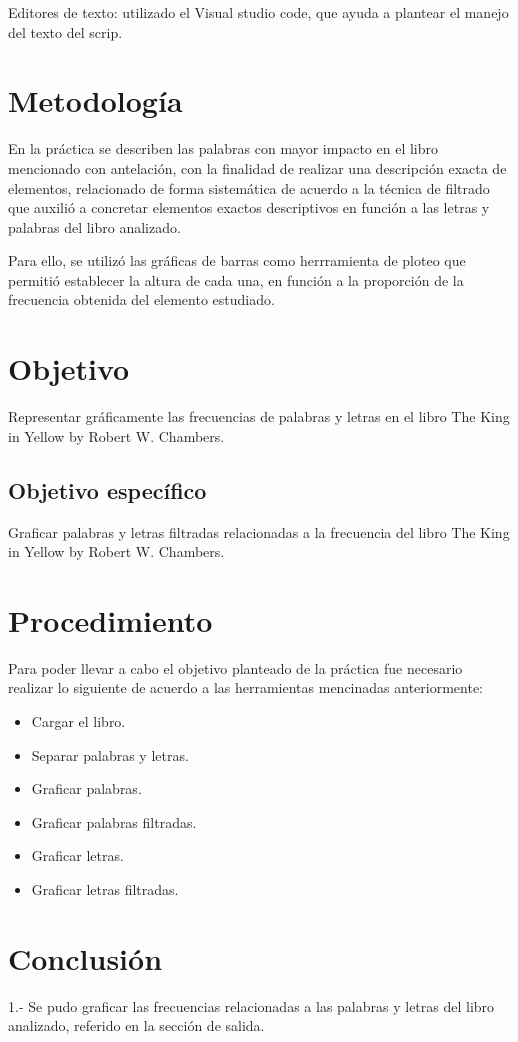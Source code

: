 \documentclass{article}
\begin{document}
Editores de texto: utilizado el Visual studio code\cite{Visual_studio_code}, que ayuda a plantear el manejo del texto del scrip. 

\section{Metodología}
En la práctica se describen las palabras con mayor impacto en el libro mencionado con antelación, con la finalidad de realizar una descripción exacta de elementos, relacionado de forma sistemática de acuerdo a la técnica de filtrado que auxilió  a concretar elementos exactos descriptivos en función a las letras y palabras del libro analizado.

Para ello, se utilizó las gráficas de barras como herrramienta de ploteo que permitió establecer la altura de cada una, en función a la proporción de la frecuencia obtenida del elemento estudiado.

\section{Objetivo}
Representar gráficamente las frecuencias de palabras y letras en el libro The King in Yellow by Robert W. Chambers\cite{The_King_in_Yellow}.
\subsection{Objetivo específico}
Graficar palabras y letras filtradas relacionadas a la frecuencia del libro The King in Yellow by Robert W. Chambers\cite{The_King_in_Yellow}.

\section{Procedimiento}
Para poder llevar a cabo el objetivo planteado de la práctica fue necesario realizar lo siguiente de acuerdo a las herramientas mencinadas anteriormente:
\begin{itemize}
    \item Cargar el libro.
    \item Separar palabras y letras.
    \item Graficar palabras.
    \item Graficar palabras filtradas.
    \item Graficar letras.
    \item Graficar letras filtradas.
\end{itemize} 
\section{Conclusión}
1.- Se pudo graficar las frecuencias relacionadas a las palabras y letras del libro analizado, referido en la sección de salida.
\end{document}
